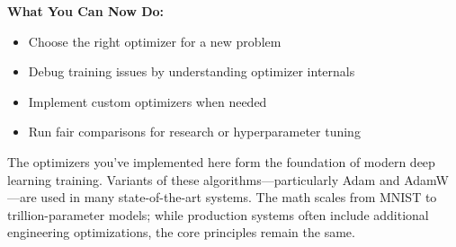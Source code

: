 \documentclass[../../main.tex]{subfiles}
\begin{document}
\begin{keyconcept}
\textbf{What You Can Now Do:}
\begin{itemize}
    \item Choose the right optimizer for a new problem
    \item Debug training issues by understanding optimizer internals
    \item Implement custom optimizers when needed
    \item Run fair comparisons for research or hyperparameter tuning
\end{itemize}
\end{keyconcept}

The optimizers you've implemented here form the foundation of modern deep learning training. Variants of these algorithms---particularly Adam and AdamW---are used in many state-of-the-art systems. The math scales from MNIST to trillion-parameter models; while production systems often include additional engineering optimizations, the core principles remain the same.
\end{document}
